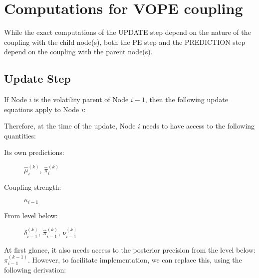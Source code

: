\section{Computations for VOPE coupling}
While the exact computations of the \textsf{UPDATE step} depend on the nature of the coupling with the child node(s), both the \textsf{PE step} and the \textsf{PREDICTION step} depend on the coupling with the parent node(s).

\subsection{Update Step}
If Node $i$ is the volatility parent of Node $i-1$, then the following update equations apply to Node $i$:
\vspace{0.5cm}

\noindent
{}%
\vspace{0.5cm}

\noindent
Therefore, at the time of the update, Node $i$ needs to have access to the following quantities:

\begin{description}
\item[Its own predictions:]  	$\hat{\mu}_i^{(k)}$, $\hat{\pi}_i^{(k)}$
\item[Coupling strength:] 		$\kappa_{i-1}$
\item[From level below:]		$\delta_{i-1}^{(k)}$, $\hat{\pi}_{i-1}^{(k)}$, 
								$\nu_{i-1}^{(k)}$
\end{description}

At first glance, it also needs access to the posterior precision from the level below: $\pi_{i-1}^{(k-1)}$. However, to facilitate implementation, we can replace this, using the following derivation:

